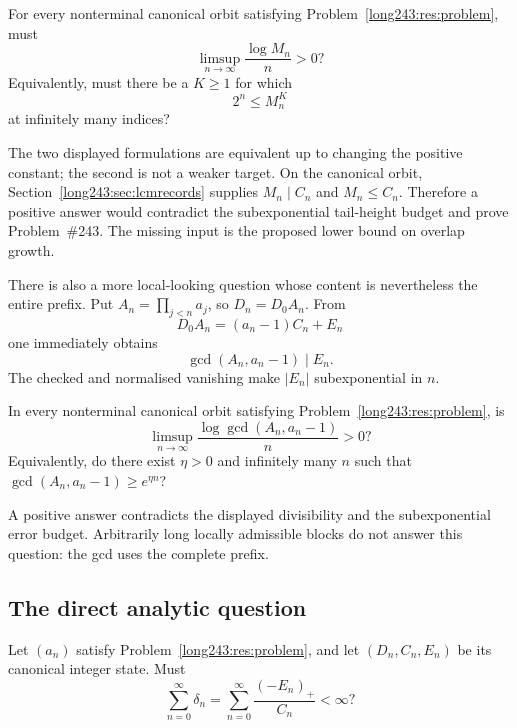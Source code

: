 \documentclass[11pt]{article}
\begin{document}
\begin{problem}\label{long243:res:lcmheight}
For every nonterminal canonical orbit satisfying Problem~\ref{long243:res:problem},
must
\[
 \limsup_{n\to\infty}\frac{\log M_n}{n}>0?
\]
Equivalently, must there be a $K\ge1$ for which
\[
 2^n\le M_n^K
\]
at infinitely many indices?
\end{problem}

\noindent The two displayed formulations are equivalent up to changing the
positive constant; the second is not a weaker target. On the canonical orbit,
Section~\ref{long243:sec:lcmrecords} supplies $M_n\mid C_n$ and $M_n\le C_n$.
Therefore a positive answer would contradict the subexponential tail-height
budget and prove Problem~\#243. The missing input is the proposed lower
bound on overlap growth.

There is also a more local-looking question whose content is nevertheless the
entire prefix.  Put $A_n=\prod_{j<n}a_j$, so $D_n=D_0A_n$.  From
\[
 D_0A_n=(a_n-1)C_n+E_n
\]
one immediately obtains
\[
 \gcd(A_n,a_n-1)\mid E_n.
\]
The checked
and normalised vanishing make $|E_n|$ subexponential in $n$.

\begin{problem}\label{long243:res:prefixgcd}
In every nonterminal canonical orbit satisfying Problem~\ref{long243:res:problem}, is
\[
 \limsup_{n\to\infty}
 \frac{\log\gcd(A_n,a_n-1)}{n}>0?
\]
Equivalently, do there exist $\eta>0$ and infinitely many $n$ such that
$\gcd(A_n,a_n-1)\ge e^{\eta n}$?
\end{problem}

\noindent A positive answer contradicts the displayed divisibility and the
subexponential error budget.  Arbitrarily long locally admissible blocks do
not answer this question: the gcd uses the complete prefix.

\subsection{The direct analytic question}

\begin{problem}\label{long243:res:masshyp}
Let $(a_n)$ satisfy Problem~\ref{long243:res:problem}, and let $(D_n,C_n,E_n)$ be its
canonical integer state.  Must
\[
 \sum_{n=0}^{\infty}\delta_n
 =\sum_{n=0}^{\infty}\frac{(-E_n)_+}{C_n}<\infty ?
\]
\end{problem}
\end{document}
